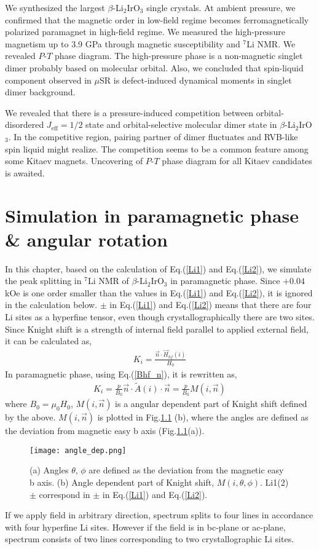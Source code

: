 \documentclass[a4,10.5pt]{report}
\begin{document}
We synthesized the largest $\beta$-Li$_2$IrO$_3$ single crystals.
At ambient pressure, we confirmed that the magnetic order in low-field regime becomes ferromagnetically polarized paramagnet in high-field regime.
We measured the high-pressure magnetism up to 3.9 GPa through magnetic susceptibility and ${}^7$Li NMR. 
We revealed $P$-$T$ phase diagram. 
The high-pressure phase is a non-magnetic singlet dimer probably based on molecular orbital. 
Also, we concluded that spin-liquid component observed in $\mu$SR is defect-induced dynamical moments in singlet dimer background. 

We revealed that there is a pressure-induced competition between orbital-disordered $J_{\mathrm{eff}} = 1/2$ state and orbital-selective molecular dimer state in $\beta$-Li$_2$IrO$_3$.
In the competitive region, pairing partner of dimer fluctuates and RVB-like spin liquid might realize.
The competition seems to be a common feature among some Kitaev magnets. 
Uncovering of $P$-$T$ phase diagram for all Kitaev candidates is awaited.


\appendix
\chapter{Simulation in paramagnetic phase \& angular rotation}
\label{appendix_simu}
In this chapter, based on the calculation of Eq.(\ref{Li1}) and Eq.(\ref{Li2}), we simulate the peak splitting in ${}^7$Li NMR of $\beta$-Li$_2$IrO$_3$ in paramagnetic phase.
Since $+ 0 .04$ kOe is one order smaller than the values in Eq.(\ref{Li1}) and Eq.(\ref{Li2}), it is ignored in the calculation below.
$\pm$ in Eq.(\ref{Li1}) and Eq.(\ref{Li2}) means that there are four Li sites as a hyperfine tensor, even though crystallographically there are two sites.  
Since Knight shift is a strength of internal field parallel to applied external field, it can be calculated as, 
\begin{align}
K_i = \frac{\vec{n}\cdot\overrightarrow{H}_{hf}(i)}{H_0}
\end{align}
In paramagnetic phase, using Eq.(\ref{Bhf_n}), it is rewritten as,
\begin{align}
K_i = \frac{p}{B_0}\vec{n}\cdot\tilde{A}(i)\cdot\vec{n} = \frac{p}{B_0}M(i, \vec{n})
\end{align}
where $B_0 = \mu_0H_0$, $M (i,\vec{n})$ is a angular dependent part of Knight shift defined by the above.
$M (i,\vec{n})$ is plotted in Fig.\ref{angle_dep} (b),
where the angles are defined as the deviation from magnetic easy b axis (Fig.\ref{angle_dep}(a)).
\begin{figure}
  \centering
  \texttt{[image: angle\_dep.png]}
  \caption{(a) Angles $\theta$, $\phi$ are defined as the deviation from the magnetic easy b axis.
  (b) Angle dependent part of Knight shift, $M (i, \theta, \phi)$. 
  Li1(2)$\pm$ correspond in $\pm$ in Eq.(\ref{Li1}) and Eq.(\ref{Li2}).}
  \label{angle_dep}
\end{figure}
If we apply field in arbitrary direction, spectrum splits to four lines in accordance with four hyperfine Li sites.
However if the field is in bc-plane or ac-plane, spectrum consists of two lines corresponding to two crystallographic Li sites.
\end{document}
